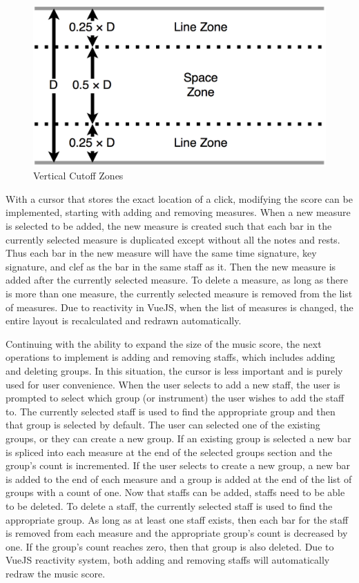 \documentclass[letterpaper,12pt]{article}
\begin{document}
\begin{figure}[H]
    \begin{center}
        \includegraphics[scale=0.2]{imgs/vert-cutoff.png}
    \end{center}
    \caption{Vertical Cutoff Zones}
    \label{fig:vert-cutoff}
\end{figure}

With a cursor that stores the exact location of a click, modifying the score can be implemented, starting with adding
and removing measures. When a new measure is selected to be added, the new measure is created such that each bar in the
currently selected measure is duplicated except without all the notes and rests. Thus each bar in the new measure will
have the same time signature, key signature, and clef as the bar in the same staff as it. Then the new measure is added
after the currently selected measure. To delete a measure, as long as there is more than one measure, the currently
selected measure is removed from the list of measures. Due to reactivity in VueJS, when the list of measures is changed,
the entire layout is recalculated and redrawn automatically.

Continuing with the ability to expand the size of the music score, the next operations to implement is adding and
removing staffs, which includes adding and deleting groups. In this situation, the cursor is less important and is
purely used for user convenience. When the user selects to add a new staff, the user is prompted to select which group
(or instrument) the user wishes to add the staff to. The currently selected staff is used to find the appropriate group
and then that group is selected by default. The user can selected one of the existing groups, or they can create a new
group. If an existing group is selected a new bar is spliced into each measure at the end of the selected groups
section and the group's count is incremented. If the user selects to create a new group, a new bar is added to the end
of each measure and a group is added at the end of the list of groups with a count of one. Now that staffs can be added,
staffs need to be able to be deleted. To delete a staff, the currently selected staff is used to find the appropriate
group. As long as at least one staff exists, then each bar for the staff is removed from each measure and the
appropriate group's count is decreased by one. If the group's count reaches zero, then that group is also deleted. Due
to VueJS reactivity system, both adding and removing staffs will automatically redraw the music score.
\end{document}
